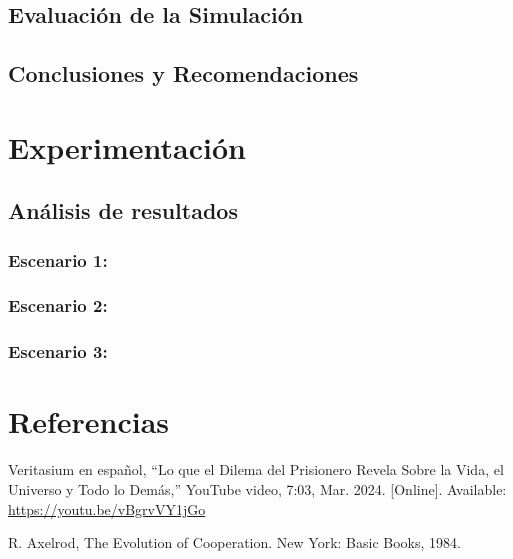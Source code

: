 \documentclass{article}
\begin{document}
\subsection{Evaluación de la Simulación}


\subsection{Conclusiones y Recomendaciones}



\section{Experimentación}\label{sec:exp}

\subsection{Análisis de resultados}

\subsubsection{Escenario 1: }

\subsubsection{Escenario 2: }
 
\subsubsection{Escenario 3: }



\section{Referencias}
\renewcommand{\refname}{}

\begin{thebibliography}{9}

 \label{ref:vidIntro} Veritasium en español, “Lo que el Dilema del Prisionero Revela 
Sobre la Vida, el Universo y Todo lo Demás,” YouTube video, 7:03, Mar. 2024. [Online]. 
Available: \url{https://youtu.be/vBgrvVY1jGo}

 \label{ref:just} R. Axelrod, The Evolution of Cooperation. New York: 
Basic Books, 1984.

\end{thebibliography}
\end{document}
